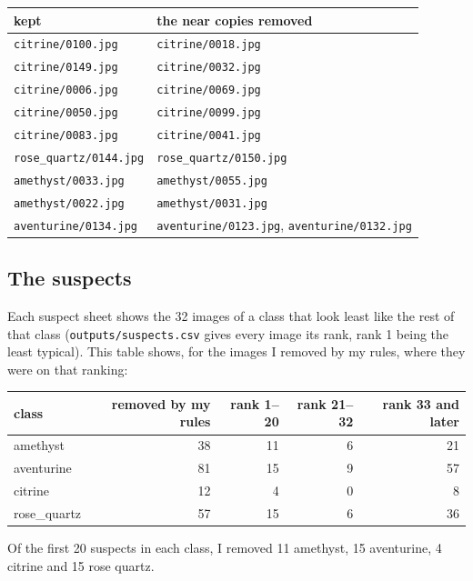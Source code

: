 \documentclass[11pt]{article}
\begin{document}
\begin{center}\footnotesize
\begin{tabular}{ll}
\toprule
kept & the near copies removed \\
\midrule
\texttt{citrine/0100.jpg} & \texttt{citrine/0018.jpg} \\
\texttt{citrine/0149.jpg} & \texttt{citrine/0032.jpg} \\
\texttt{citrine/0006.jpg} & \texttt{citrine/0069.jpg} \\
\texttt{citrine/0050.jpg} & \texttt{citrine/0099.jpg} \\
\texttt{citrine/0083.jpg} & \texttt{citrine/0041.jpg} \\
\texttt{rose\_quartz/0144.jpg} & \texttt{rose\_quartz/0150.jpg} \\
\texttt{amethyst/0033.jpg} & \texttt{amethyst/0055.jpg} \\
\texttt{amethyst/0022.jpg} & \texttt{amethyst/0031.jpg} \\
\texttt{aventurine/0134.jpg} & \texttt{aventurine/0123.jpg}, \texttt{aventurine/0132.jpg} \\
\bottomrule
\end{tabular}
\end{center}

\subsection*{The suspects}
Each suspect sheet shows the 32 images of a class that look least like the rest
of that class (\texttt{outputs/suspects.csv} gives every image its rank, rank 1
being the least typical). This table shows, for the images I removed by my
rules, where they were on that ranking:

\begin{center}\footnotesize
\begin{tabular}{lrrrr}
\toprule
class & removed by my rules & rank 1--20 & rank 21--32 & rank 33 and later \\
\midrule
amethyst & 38 & 11 & 6 & 21 \\
aventurine & 81 & 15 & 9 & 57 \\
citrine & 12 & 4 & 0 & 8 \\
rose\_quartz & 57 & 15 & 6 & 36 \\
\bottomrule
\end{tabular}
\end{center}

Of the first 20 suspects in each class, I removed 11 amethyst, 15 aventurine, 4
citrine and 15 rose quartz.
\end{document}

